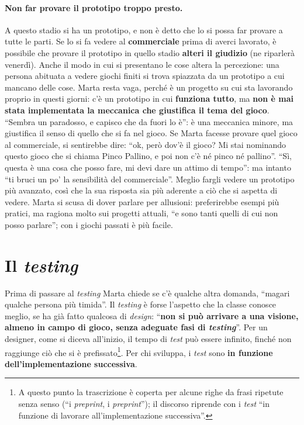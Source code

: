 \paragraph{Non far provare il prototipo troppo presto.} A questo stadio si ha un prototipo,
e non è detto che lo si possa far provare a tutte le parti. Se lo si fa vedere al
\textbf{commerciale} prima di averci lavorato, è possibile che provare il prototipo in quello
stadio \textbf{alteri il giudizio} (ne riparlerà venerdì). Anche il modo in cui si presentano
le cose altera la percezione: una persona abituata a vedere giochi finiti si trova
spiazzata da un prototipo a cui mancano delle cose. Marta resta vaga, perché è un progetto
su cui sta lavorando proprio in questi giorni: c'è un prototipo in cui \textbf{funziona
tutto}, ma \textbf{non è mai stata implementata la meccanica che giustifica il tema del
gioco}. ``Sembra un paradosso, e capisco che da fuori lo è'': è una meccanica minore, ma
giustifica il senso di quello che si fa nel gioco. Se Marta facesse provare quel gioco al
commerciale, si sentirebbe dire: ``ok, però dov'è il gioco? Mi stai nominando questo gioco
che si chiama Pinco Pallino, e poi non c'è né pinco né pallino''. ``Sì, questa è una cosa
che posso fare, mi devi dare un attimo di tempo'': ma intanto ``ti bruci un po' la
sensibilità del commerciale''. Meglio fargli vedere un prototipo più avanzato, così che la
sua risposta sia più aderente a ciò che si aspetta di vedere. Marta si scusa di dover
parlare per allusioni: preferirebbe esempi più pratici, ma ragiona molto sui progetti
attuali, ``e sono tanti quelli di cui non posso parlare''; con i giochi passati è più facile.

\section{Il \emph{testing}}
\label{a13:sec:testing}



Prima di passare al \emph{testing} Marta chiede se c'è qualche altra domanda, ``magari
qualche persona più timida''. Il \emph{testing} è forse l'aspetto che la classe conosce
meglio, se ha già fatto qualcosa di \emph{design}: ``\textbf{non si può arrivare a una
visione, almeno in campo di gioco, senza adeguate fasi di \emph{testing}}''. Per un
designer, come si diceva all'inizio, il tempo di \emph{test} può essere infinito, finché
non raggiunge ciò che si è prefissato\footnote{A questo punto la trascrizione è coperta per
alcune righe da frasi ripetute senza senso (``i \emph{preprint}, i \emph{preprint}''); il
discorso riprende con i \emph{test} ``in funzione di lavorare all'implementazione
successiva''.}. Per chi sviluppa, i \emph{test} sono \textbf{in funzione
dell'implementazione successiva}.

